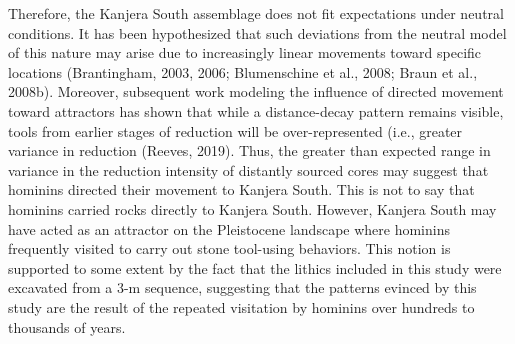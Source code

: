 \documentclass[]{elsarticle} %
\begin{document}
Therefore, the Kanjera South assemblage does not fit expectations under
neutral conditions. It has been hypothesized that such deviations from
the neutral model of this nature may arise due to increasingly linear
movements toward specific locations (\hspace{0pt}Brantingham,
2003\hspace{0pt}, \hspace{0pt}2006\hspace{0pt}; \hspace{0pt}Blumenschine
et al., 2008\hspace{0pt}; \hspace{0pt}Braun et al., 2008b\hspace{0pt}).
Moreover, subsequent work modeling the influence of directed movement
toward attractors has shown that while a distance-decay pattern remains
visible, tools from earlier stages of reduction will be over-represented
(i.e., greater variance in reduction (\hspace{0pt}Reeves,
2019\hspace{0pt}). Thus, the greater than expected range in variance in
the reduction intensity of distantly sourced cores may suggest that
hominins directed their movement to Kanjera South. This is not to say
that hominins carried rocks directly to Kanjera South. However, Kanjera
South may have acted as an attractor on the Pleistocene landscape where
hominins frequently visited to carry out stone tool-using behaviors.
This notion is supported to some extent by the fact that the lithics
included in this study were excavated from a 3-m sequence, suggesting
that the patterns evinced by this study are the result of the repeated
visitation by hominins over hundreds to thousands of years.
\end{document}
